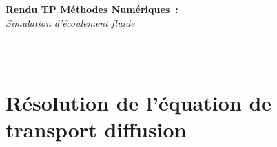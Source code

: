 \documentclass[a4paper,10pt]{article}
\begin{document}
  \begin{center}
     \begin{LARGE}
         \textbf{Rendu TP Méthodes Numériques~:}\\
         \textit{Simulation d'écoulement fluide}
     \end{LARGE}
 \end{center}
$$
$$
 \begin{center}
 \begin{LARGE}
    \end{LARGE}
\end{center}
$$
$$
$$
\section{Résolution de l'équation de transport diffusion}
\end{document}
